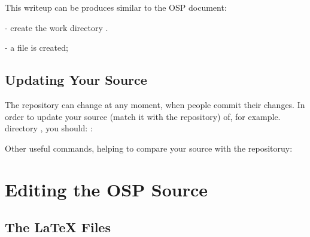 \documentclass[12pt,letterpaper]{article}
\begin{document}
  This writeup can be produces similar to the OSP document:
  \begin{list}{}{\setlength{\itemsep}{-0.15cm}}
    \item {} - create the work directory .
    \item {} 
    \item {} - a file  is created;
  \end{list}
 
\subsection{Updating Your Source}
\label{sec:updatesource}

  The repository can change at any moment, when people commit their changes.
  In order to update your source (match it with the repository) of, for example. directory , you should: :
  \begin{list}{}{\setlength{\itemsep}{-0.15cm}}
    \item {} 
    \item {} 
  \end{list}

  Other useful commands, helping to compare your source with the repositoruy:
  \begin{list}{}{\setlength{\itemsep}{-0.15cm}}
     \item {} 
     \item {} 
  \end{list}
  
\section{Editing the OSP Source}
\label{sec:edit}

\subsection{The \LaTeX{} Files}
\label{sec:latexfiles}
\end{document}
